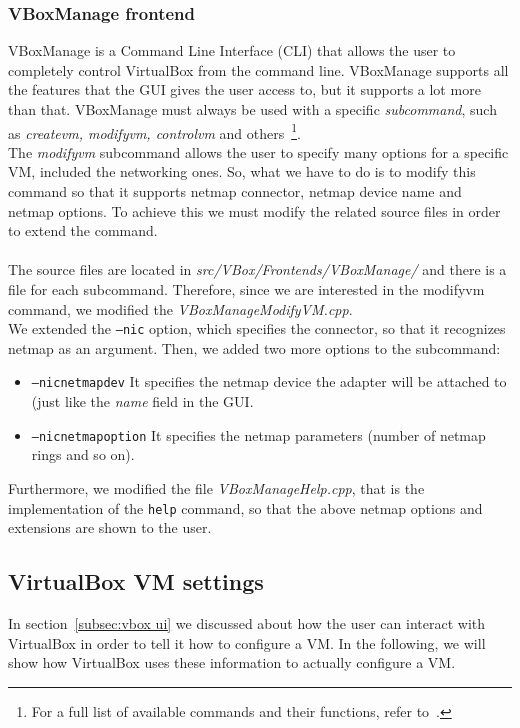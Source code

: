 \documentclass[a4paper, 12pt, titlepage]{report}
\begin{document}
\subsubsection{VBoxManage frontend}
VBoxManage is a Command Line Interface (CLI) that allows the user to completely control VirtualBox from the command line. VBoxManage supports all the features that the GUI gives the user access to, but it supports a lot more than that. VBoxManage must always be used with a specific \textit{subcommand}, such as \textit{createvm, modifyvm, controlvm} and others~\footnote{For a full list of available commands and their functions, refer to~\cite[chapter~8]{vbox}.}.
\\
The \textit{modifyvm} subcommand allows the user to specify many options for a specific VM, included the networking ones. So, what we have to do is to modify this command so that it supports netmap connector, netmap device name and netmap options. To achieve this we must modify the related source files in order to extend the command.
\\
\\
The source files are located in \textit{src/VBox/Frontends/VBoxManage/} and there is a file for each subcommand. Therefore, since we are interested in the modifyvm command, we modified the \textit{VBoxManageModifyVM.cpp}.
\\
We extended the \texttt{--nic} option, which specifies the connector, so that it recognizes netmap as an argument. Then, we added two more options to the subcommand:
\begin{itemize}
\item \texttt{--nicnetmapdev} It specifies the netmap device the adapter will be attached to (just like the \textit{name} field in the GUI.
\item \texttt{--nicnetmapoption} It specifies the netmap parameters (number of netmap rings and so on).
\end{itemize}
Furthermore, we modified the file \textit{VBoxManageHelp.cpp}, that is the implementation of the \texttt{help} command, so that the above netmap options and extensions are shown to the user.

\subsection{VirtualBox VM settings} \label{subsec:vm_settings}
In section~\ref{subsec:vbox ui} we discussed about how the user can interact with VirtualBox in order to tell it how to configure a VM. In the following, we will show how VirtualBox uses these information to actually configure a VM.
\end{document}
